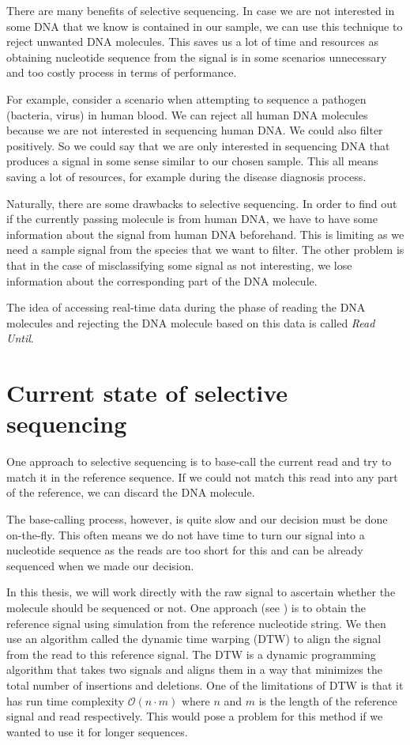 There are many benefits of selective sequencing. In case we are not interested
in some DNA that we know is contained in our sample, we can use this technique to
reject unwanted DNA molecules. This saves us a lot of time and resources as obtaining
nucleotide sequence from the signal is in some scenarios unnecessary and too
costly process in terms of performance.

For example, consider a scenario when attempting to sequence a pathogen (bacteria, virus) in human blood. We can
reject all human DNA molecules because we are not interested in sequencing human
DNA. We could also filter positively. So we could say that we are only
interested in sequencing DNA that produces a signal in some sense similar to our
chosen sample. This all means saving a lot of resources, for example during the disease diagnosis process.

Naturally, there are some drawbacks to selective sequencing. In order to find out
if the currently passing molecule is from human DNA, we have to have some information
about the signal from human DNA beforehand. This is limiting as we need a sample signal from
the species that we want to filter. The other problem is that in the case of misclassifying
some signal as not interesting, we lose information about the corresponding
part of the DNA molecule.

The idea of accessing real-time data during the phase of reading the DNA molecules
and rejecting the DNA molecule based on this data is called \textit{Read Until}. 

\section{Current state of selective sequencing}
\label{section:currState}


One approach to selective sequencing is to base-call the current read
and try to match it in the reference sequence. If we could not match this read
into any part of the reference, we can discard the DNA molecule.

The base-calling process, however, is quite slow and our decision must be done on-the-fly.
This often means we do not have time to turn our signal into a nucleotide sequence
as the reads are too short for this and can be already sequenced when we made our decision.

In this thesis, we will work directly with the raw signal to ascertain whether the molecule
should be sequenced or not. One approach (see \cite{loose2016real}) is to obtain the reference signal using
simulation from the reference nucleotide string. We then use an algorithm called
the dynamic time warping (DTW) to align the signal from the read to this reference signal.
The DTW is a dynamic programming algorithm that takes two signals and aligns them in a
way that minimizes the total number of insertions and deletions. One of the limitations
of DTW is that it has run time complexity $\mathcal{O}(n\cdot m)$ where $n$ and $m$
is the length of the reference signal and read respectively. This would pose a problem
for this method if we wanted to use it for longer sequences.

